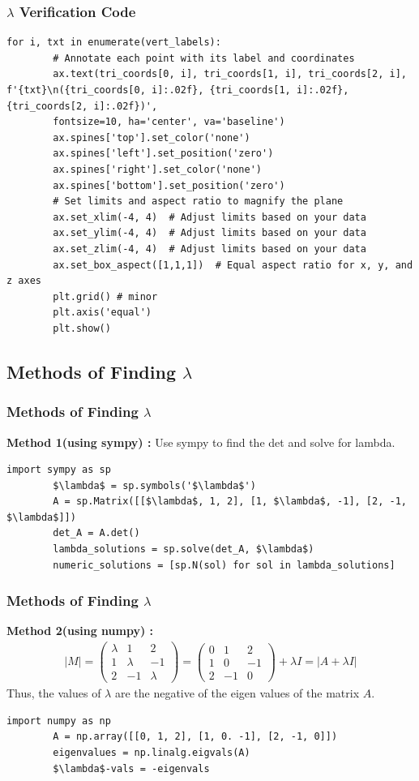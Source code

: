 \documentclass{beamer}
\theoremstyle{remark}
\providecommand{\abs}[1]{\left\vert#1\right\vert}
\newcommand{\myvec}[1]{\ensuremath{\begin{pmatrix}#1\end{pmatrix}}}
\numberwithin{equation}{section}
\begin{document}
\begin{frame}[fragile]
	\frametitle{$\lambda$ Verification Code}
	\begin{lstlisting}[mathescape=true]
		for i, txt in enumerate(vert_labels):
		# Annotate each point with its label and coordinates
		ax.text(tri_coords[0, i], tri_coords[1, i], tri_coords[2, i], f'{txt}\n({tri_coords[0, i]:.02f}, {tri_coords[1, i]:.02f}, {tri_coords[2, i]:.02f})',
		fontsize=10, ha='center', va='baseline')
		ax.spines['top'].set_color('none')
		ax.spines['left'].set_position('zero')
		ax.spines['right'].set_color('none')
		ax.spines['bottom'].set_position('zero')
		# Set limits and aspect ratio to magnify the plane
		ax.set_xlim(-4, 4)  # Adjust limits based on your data
		ax.set_ylim(-4, 4)  # Adjust limits based on your data
		ax.set_zlim(-4, 4)  # Adjust limits based on your data
		ax.set_box_aspect([1,1,1])  # Equal aspect ratio for x, y, and z axes
		plt.grid() # minor
		plt.axis('equal')
		plt.show()
	\end{lstlisting}
\end{frame}

\subsection{Methods of Finding $\lambda$}
\begin{frame}[fragile]
	\frametitle{Methods of Finding $\lambda$}
	\textbf{Method 1(using sympy) : } Use sympy to find the det and solve for lambda.
	\begin{lstlisting}[mathescape=true]
		import sympy as sp
		$\lambda$ = sp.symbols('$\lambda$')
		A = sp.Matrix([[$\lambda$, 1, 2], [1, $\lambda$, -1], [2, -1, $\lambda$]])
		det_A = A.det()
		lambda_solutions = sp.solve(det_A, $\lambda$)
		numeric_solutions = [sp.N(sol) for sol in lambda_solutions]
	\end{lstlisting}
		
\end{frame}
\begin{frame}[fragile]
	\frametitle{Methods of Finding $\lambda$}
	\textbf{Method 2(using numpy) : } 
	\begin{align}
		\abs{M} = \myvec{\lambda & 1 & 2 \\ 1 & \lambda & -1 \\ 2 & -1 & \lambda} = \myvec{0 & 1 & 2 \\ 1 & 0 & -1 \\ 2 & -1 & 0} + \lambda I = \abs{A + \lambda I}
	\end{align}
	Thus, the values of $\lambda$ are the negative of the eigen values of the matrix $A$.\\
	\begin{lstlisting}[mathescape=true]
		import numpy as np
		A = np.array([[0, 1, 2], [1, 0. -1], [2, -1, 0]])
		eigenvalues = np.linalg.eigvals(A)
		$\lambda$-vals = -eigenvals
	\end{lstlisting}
\end{frame}
\end{document}
